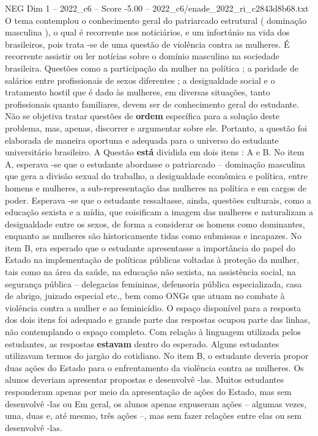 \begin{textsample}{NEG Dim 1 – 2022\_c6 – Score -5.00 – 2022\_c6/enade\_2022\_ri\_c2843d8b68.txt}
O tema contemplou o conhecimento geral do patriarcado estrutural ( dominação masculina ), o qual é recorrente nos noticiários, e um infortúnio na vida dos brasileiros, pois trata -se de uma questão de violência contra as mulheres.
É recorrente assistir ou ler notícias sobre o domínio masculino na sociedade brasileira.
Questões como a participação da mulher na política ; a paridade de salários entre profissionais de sexos diferentes ; a desigualdade social e o tratamento hostil que é dado às mulheres, em diversas situações, tanto profissionais quanto familiares, devem ser de conhecimento geral do estudante.
Não se objetiva tratar questões de \textbf{ordem} específica para a solução deste problema, mas, apenas, discorrer e argumentar sobre ele.
Portanto, a questão foi elaborada de maneira oportuna e adequada para o universo do estudante universitário brasileiro.
A Questão \textbf{está} dividida em dois itens : A e B.
No item A, esperava -se que o estudante abordasse o patriarcado – dominação masculina que gera a divisão sexual do trabalho, a desigualdade econômica e política, entre homens e mulheres, a sub-representação das mulheres na política e em cargos de poder.
Esperava -se que o estudante ressaltasse, ainda, questões culturais, como a educação sexista e a mídia, que coisificam a imagem das mulheres e naturalizam a desigualdade entre os sexos, de forma a considerar os homens como dominantes, enquanto as mulheres são historicamente tidas como submissas e incapazes.
No item B, era esperado que o estudante apresentasse a importância do papel do Estado na implementação de políticas públicas voltadas à proteção da mulher, tais como na área da saúde, na educação não sexista, na assistência social, na segurança pública – delegacias femininas, defensoria pública especializada, casa de abrigo, juizado especial etc., bem como ONGs que atuam no combate à violência contra a mulher e ao feminicídio.
O espaço disponível para a resposta dos dois itens foi adequado e grande parte das respostas ocupou parte das linhas, não contemplando o espaço completo.
Com relação à linguagem utilizada pelos estudantes, as respostas \textbf{estavam} dentro do esperado.
Alguns estudantes utilizavam termos do jargão do cotidiano.
No item B, o estudante deveria propor duas ações do Estado para o enfrentamento da violência contra as mulheres.
Os alunos deveriam apresentar propostas e desenvolvê -las.
Muitos estudantes responderam apenas por meio da apresentação de ações do Estado, mas sem desenvolvê -las ou Em geral, os alunos apenas expuseram ações – algumas vezes, uma, duas e, até mesmo, três ações –, mas sem fazer relações entre elas ou sem desenvolvê -las.

\end{textsample}
